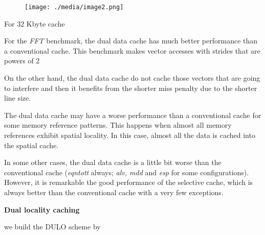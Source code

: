 \documentclass[12pt]{article}
\begin{document}

\begin{figure}[H]
	\begin{Center}
		\texttt{[image: ./media/image2.png]}
	\end{Center}
\end{figure}



\par

{\fontsize{10pt}{12.0pt}\selectfont For 32 Kbyte cache\par}\par

For the \textit{FFT }benchmark, the dual data cache has much better performance than a conventional cache. This benchmark makes vector accesses with strides that are powers of 2\par

\begin{adjustwidth}{-0.01in}{0.0in}
On the other hand, the dual data cache do not cache those vectors that are going to interfere and then it benefits from the shorter miss penalty due to the shorter line size.\par

\end{adjustwidth}

The dual data cache may have a worse performance than a conventional cache for some memory reference patterns. This happens when almost all memory references exhibit spatial locality. In this case, almost all the data is cached into the spatial cache.\par

In some other cases, the dual data cache is a little bit worse than the conventional cache (\textit{eqntott} always; \textit{alv, mdd }and\textit{ esp }for some configurations). However, it is remarkable the good performance of the selective cache, which is always better than the conventional cache with a very few exceptions.\par


\vspace{\baselineskip}
{\fontsize{16pt}{19.2pt}\selectfont \textbf{Dual locality caching }\par}\par

\setlength{\parskip}{0.0pt}
{\fontsize{10pt}{12.0pt}\selectfont we build the DULO scheme by\par}\par
\end{document}
